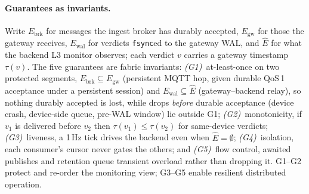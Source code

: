\documentclass[runningheads]{llncs}
\begin{document}
\paragraph{Guarantees as invariants.}
Write $E_{\mathrm{brk}}$ for messages the ingest broker has durably accepted,
$E_{\mathrm{gw}}$ for those the gateway receives, $E_{\mathrm{wal}}$ for verdicts
\texttt{fsync}ed to the gateway WAL, and $\hat{E}$ for what the backend L3 monitor
observes; each verdict $v$ carries a gateway timestamp $\tau(v)$. The five guarantees
are fabric invariants:
\emph{(G1)}~at-least-once on two protected segments,
$E_{\mathrm{brk}}\subseteq E_{\mathrm{gw}}$ (persistent MQTT hop, given durable QoS\,1
acceptance under a persistent session) and $E_{\mathrm{wal}}\subseteq\hat{E}$
(gateway--backend relay), so nothing durably accepted is lost, while drops \emph{before}
durable acceptance (device crash, device-side queue, pre-WAL window) lie outside G1;
\emph{(G2)}~monotonicity, if $v_1$ is delivered before $v_2$ then
$\tau(v_1)\le\tau(v_2)$ for same-device verdicts;
\emph{(G3)}~liveness, a 1\,Hz tick drives the backend even when $\hat{E}=\emptyset$;
\emph{(G4)}~isolation, each consumer's cursor never gates the others; and
\emph{(G5)}~flow control, awaited publishes and retention queue transient overload
rather than dropping it. G1--G2 protect and re-order the monitoring view; G3--G5
enable resilient distributed operation.
\end{document}
